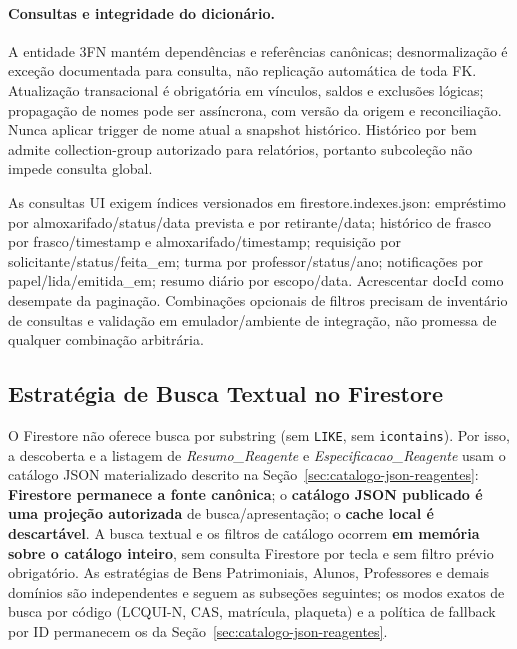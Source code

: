 \paragraph{Consultas e integridade do dicionário.}
A entidade 3FN mantém dependências e referências canônicas; desnormalização é exceção documentada para consulta, não replicação automática de toda FK. Atualização transacional é obrigatória em vínculos, saldos e exclusões lógicas; propagação de nomes pode ser assíncrona, com versão da origem e reconciliação. Nunca aplicar trigger de nome atual a snapshot histórico. Histórico por bem admite collection-group autorizado para relatórios, portanto subcoleção não impede consulta global.

As consultas UI exigem índices versionados em firestore.indexes.json: empréstimo por almoxarifado/status/data prevista e por retirante/data; histórico de frasco por frasco/timestamp e almoxarifado/timestamp; requisição por solicitante/status/feita\_em; turma por professor/status/ano; notificações por papel/lida/emitida\_em; resumo diário por escopo/data. Acrescentar docId como desempate da paginação. Combinações opcionais de filtros precisam de inventário de consultas e validação em emulador/ambiente de integração, não promessa de qualquer combinação arbitrária.

\endgroup
\subsection{Estratégia de Busca Textual no Firestore}
\label{subsec:busca-textual}

\begin{explicacao}
O Firestore não oferece busca por substring (sem \texttt{LIKE}, sem
\texttt{icontains}). Por isso, a descoberta e a listagem de
\textit{Resumo\_Reagente} e \textit{Especificacao\_Reagente} usam o catálogo JSON
materializado descrito na Seção~\ref{sec:catalogo-json-reagentes}: \textbf{Firestore permanece a fonte
canônica}; o \textbf{catálogo JSON publicado é uma projeção autorizada} de
busca/apresentação; o \textbf{cache local é descartável}. A busca textual e os
filtros de catálogo ocorrem \textbf{em memória sobre o catálogo inteiro}, sem
consulta Firestore por tecla e sem filtro prévio obrigatório. As estratégias de
Bens Patrimoniais, Alunos, Professores e demais domínios são independentes e
seguem as subseções seguintes; os modos exatos de busca por código (LCQUI-N, CAS,
matrícula, plaqueta) e a política de fallback por ID permanecem os da Seção~\ref{sec:catalogo-json-reagentes}.
\end{explicacao}

